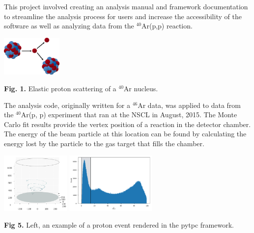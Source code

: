 \documentclass[ansiepaper,portrait]{baposter}
\begin{document}
\begin{poster}
{{This project involved creating an analysis manual and framework documentation to streamline the analysis process for users and increase the accessibility of the software as well as analyzing data from the $^{40}$Ar(p,p) reaction.}

\begin{center}
\includegraphics[width=30mm]{ar40_p.png}
\end{center}

\small{\textbf{Fig. 1.} Elastic proton scattering of a $^{40}$Ar nucleus.}
}
{\small{The analysis code, originally written for a $^{46}$Ar data, was applied to data from the $^{40}$Ar(p, p) experiment that ran at the NSCL in August,  2015.}
\small{The Monte Carlo fit results provide the vertex position of a reaction in the detector chamber. The energy of the beam particle at this location can be found by calculating the energy lost by the particle to the gas target that fills the chamber.}

\begin{center}
\includegraphics[height=30mm]{chamber_plot.png}
\hspace{.75cm}
\includegraphics [height=30mm] {chi2pos.pdf}
\end{center}

\small{\textbf{Fig 5.} Left, an example of a proton event rendered in the pytpc framework.}

}
\end{poster}
\end{document}
